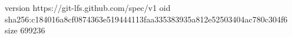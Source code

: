 version https://git-lfs.github.com/spec/v1
oid sha256:c184016a8cf0874363e519444113faa335383935a812e52503404ac780c304f6
size 699236
